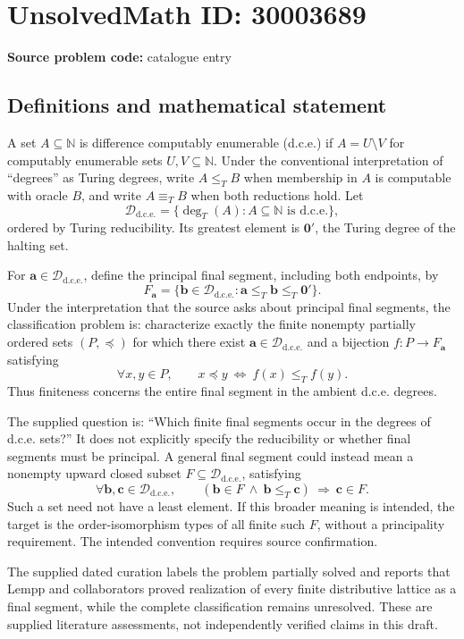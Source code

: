 \documentclass[11pt]{article}
\newcommand{\N}{\mathbb{N}}
\begin{document}
\section*{UnsolvedMath ID: 30003689}
\textbf{Source problem code:} catalogue entry
\subsection{Definitions and mathematical statement}
A set \(A\subseteq\N\) is difference computably enumerable (d.c.e.) if \(A=U\setminus V\) for computably enumerable sets \(U,V\subseteq\N\). Under the conventional interpretation of ``degrees'' as Turing degrees, write \(A\leq_T B\) when membership in \(A\) is computable with oracle \(B\), and write \(A\equiv_T B\) when both reductions hold. Let
\[
\mathcal D_{\mathrm{d.c.e.}}=\{\deg_T(A):A\subseteq\N\text{ is d.c.e.}\},
\]
ordered by Turing reducibility. Its greatest element is \(\mathbf 0'\), the Turing degree of the halting set.

For \(\mathbf a\in\mathcal D_{\mathrm{d.c.e.}}\), define the principal final segment, including both endpoints, by
\[
F_{\mathbf a}=\{\mathbf b\in\mathcal D_{\mathrm{d.c.e.}}:\mathbf a\leq_T\mathbf b\leq_T\mathbf 0'\}.
\]
Under the interpretation that the source asks about principal final segments, the classification problem is: characterize exactly the finite nonempty partially ordered sets \((P,\preceq)\) for which there exist \(\mathbf a\in\mathcal D_{\mathrm{d.c.e.}}\) and a bijection \(f:P\to F_{\mathbf a}\) satisfying
\[
\forall x,y\in P,\qquad x\preceq y\ \Longleftrightarrow\ f(x)\leq_T f(y).
\]
Thus finiteness concerns the entire final segment in the ambient d.c.e. degrees.

The supplied question is: ``Which finite final segments occur in the degrees of d.c.e. sets?'' It does not explicitly specify the reducibility or whether final segments must be principal. A general final segment could instead mean a nonempty upward closed subset \(F\subseteq\mathcal D_{\mathrm{d.c.e.}}\), satisfying
\[
\forall\mathbf b,\mathbf c\in\mathcal D_{\mathrm{d.c.e.}},\qquad
(\mathbf b\in F\ \land\ \mathbf b\leq_T\mathbf c)\ \Longrightarrow\ \mathbf c\in F.
\]
Such a set need not have a least element. If this broader meaning is intended, the target is the order-isomorphism types of all finite such \(F\), without a principality requirement. The intended convention requires source confirmation.

The supplied dated curation labels the problem partially solved and reports that Lempp and collaborators proved realization of every finite distributive lattice as a final segment, while the complete classification remains unresolved. These are supplied literature assessments, not independently verified claims in this draft.
\end{document}

